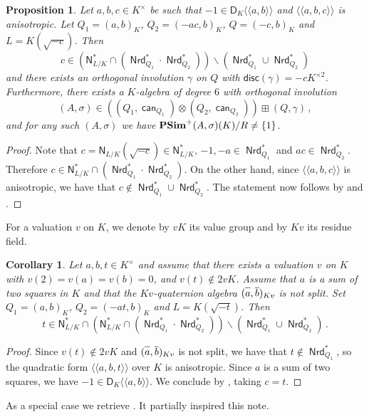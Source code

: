 \documentclass[twoside,11pt]{amsart}
\numberwithin{equation}{section}
\newtheorem{prop}[equation]{Proposition}
\newtheorem{cor}[equation]{Corollary}
\theoremstyle{definition}
\newcommand\Nrd{\operatorname{\mathsf{Nrd}}}
\newcommand\N{\operatorname{N}}
\newcommand{\can}{\operatorname{\mathsf{can}}}
\newcommand{\mg}[1]{{#1}^{\times}}
\newcommand{\sq}[1]{{#1}^{\times 2}}
\newcommand{\s}{\sigma}
\newcommand{\la}{\langle}
\newcommand{\ra}{\rangle}
\newcommand{\lla}{\la\!\la}
\newcommand{\rra}{\ra\!\ra}
\renewcommand{\N}{\mathsf{N}}
\newcommand{\disc}{\mathsf{disc}}
\newcommand{\ovl}{\overline}
\renewcommand{\setminus}{\smallsetminus}
\newcommand{\D}{\mathsf{D}}
\renewcommand{\setminus}{\smallsetminus}
\begin{document}
\begin{prop}\label{P:3-Pfister-A3-example}
    Let $a,b,c\in\mg{K}$ be such that $-1\in\D_K{\lla a,b\rra}$ and
    $\lla a,b,c\rra$ is anisotropic.
Let $Q_1=(a,b)_K$, $Q_2=(-ac,b)_K$, $Q=(-c,b)_K$ and $L=K(\sqrt{-c})$. 
 Then $$c\in\left(\N_{L/K}^\ast\cap(\Nrd_{Q_1}^\ast\cdot \Nrd_{Q_2}^\ast)\right)\setminus (\Nrd_{Q_1}^\ast\cup\Nrd_{Q_2}^\ast)$$
and there exists an orthogonal involution $\gamma$ on $Q$ with $\disc(\gamma)=-c\sq{K}$.
Furthermore, there exists a $K$-algebra of degree $6$ with orthogonal involution $$(A,\s)\in \left((Q_1,\can_{Q_1})\otimes (Q_2,\can_{Q_2})\right)\boxplus (Q,\gamma)\,,$$ and for any such $(A,\s)$ we have ${\bf PSim}^+(A,\s)(K)/R\neq \{1\}$.
\end{prop}
\begin{proof}
Note that $c=\N_{L/K}(\sqrt{-c})\in\N_{L/K}^\ast$, $-1,-a\in \Nrd_{Q_1}^\ast$ and $ac\in \Nrd_{Q_2}^\ast$. 
Therefore $c\in\N_{L/K}^\ast\cap (\Nrd_{Q_1}^\ast\cdot\Nrd_{Q_2}^\ast)$.
On the other hand, since $\lla a,b,c \rra$ is anisotropic, we have that $c\notin\Nrd_{Q_1}^\ast\cup\Nrd_{Q_2}^\ast$.
The statement now follows by  and .
\end{proof}

For a valuation $v$ on $K$, we denote by $vK$ its value group and by $Kv$ its residue field.

\begin{cor}
    Let $a,b,t\in \mg{K}$ and assume that there exists a valuation $v$ on $K$ with $v(2)=v(a)=v(b)=0$,  and $v(t)\notin 2vK$.
    Assume that $a$ is a sum of two squares in $K$ and that the $Kv$-quaternion algebra
    $(\ovl{\vphantom{b}a},\ovl{b})_{Kv}$ is not split.
    Set $Q_1=(a,b)_{K}$, $Q_2=(-at,b)_K$ and $L=K(\sqrt{-t})$.
    Then $$t\in \N^\ast_{L/K}\cap \left(\N_{L/K}^\ast\cap(\Nrd_{Q_1}^\ast\cdot \Nrd_{Q_2}^\ast)\right)\setminus  (\Nrd^\ast_{Q_1}\cup\Nrd^\ast_{Q_2})\,.$$ 
\end{cor}

\begin{proof}
Since $v(t)\notin 2 v K$ and $(\ovl{\vphantom{b}a},\ovl{b})_{Kv}$ is not split, we have that $t\notin\Nrd_{Q_1}^\ast$, so the quadratic form $\lla a,b,t\rra$ over $K$ is anisotropic.
Since $a$ is a sum of two squares, we have $-1\in\D_K\lla a,b\rra$.
We conclude by , taking $c=t$.
\end{proof}

As a special case we retrieve \cite[Example 6.1]{PS17}. It partially inspired this note.
\end{document}
